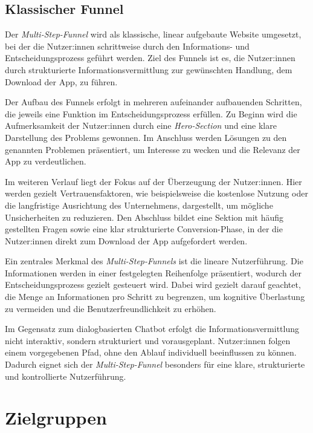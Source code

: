 \setauthor{\firstauthor}
\subsection{Klassischer Funnel}

Der \textit{Multi-Step-Funnel} wird als klassische, linear aufgebaute Website umgesetzt, 
bei der die Nutzer:innen schrittweise durch den Informations- und Entscheidungsprozess 
geführt werden. Ziel des Funnels ist es, die Nutzer:innen durch strukturierte 
Informationsvermittlung zur gewünschten Handlung, dem Download der App, zu führen.

Der Aufbau des Funnels erfolgt in mehreren aufeinander aufbauenden Schritten, 
die jeweils eine Funktion im Entscheidungsprozess erfüllen. Zu Beginn 
wird die Aufmerksamkeit der Nutzer:innen durch eine \textit{Hero-Section} und eine
klare Darstellung des Problems gewonnen. 
Im Anschluss werden Lösungen zu den genannten Problemen präsentiert, 
um Interesse zu wecken und die Relevanz der App zu verdeutlichen.

Im weiteren Verlauf liegt der Fokus auf der Überzeugung der Nutzer:innen. 
Hier werden gezielt Vertrauensfaktoren, wie beispielsweise die kostenlose Nutzung 
oder die langfristige Ausrichtung des Unternehmens, dargestellt, um mögliche Unsicherheiten zu reduzieren. 
Den Abschluss bildet eine Sektion mit häufig gestellten Fragen sowie eine klar strukturierte Conversion-Phase, 
in der die Nutzer:innen direkt zum Download der App aufgefordert werden.

Ein zentrales Merkmal des \textit{Multi-Step-Funnels} ist die lineare Nutzerführung. 
Die Informationen werden in einer festgelegten Reihenfolge präsentiert, wodurch der 
Entscheidungsprozess gezielt gesteuert wird. Dabei wird gezielt darauf 
geachtet, die Menge an Informationen pro Schritt zu begrenzen, um kognitive 
Überlastung zu vermeiden und die Benutzerfreundlichkeit zu erhöhen.

Im Gegensatz zum dialogbasierten Chatbot erfolgt die Informationsvermittlung 
nicht interaktiv, sondern strukturiert und vorausgeplant. Nutzer:innen folgen einem 
vorgegebenen Pfad, ohne den Ablauf individuell beeinflussen zu können. 
Dadurch eignet sich der \textit{Multi-Step-Funnel} besonders für eine klare, strukturierte und 
kontrollierte Nutzerführung.

\setauthor{\firstauthor}
\section{Zielgruppen}

